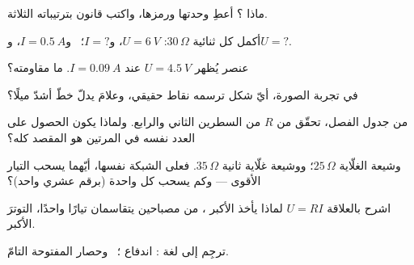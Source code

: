 \begin{exercise}[$\star$]\label{exo:g8:ohms-law:1}
ماذا  ؟ أعطِ وحدتها ورمزها، واكتب قانون 
بترتيباته الثلاثة.
\end{exercise}

\begin{exercise}[$\star$]\label{exo:g8:ohms-law:2}
أكمل كل ثنائية  $30\,\Omega$: $U = \qty{6}{V}$،
و$I = {?}$؛ \ و$I = \qty{0.5}{A}$، و$U = {?}$.
\end{exercise}

\begin{exercise}[$\star$]\label{exo:g8:ohms-law:3}
عنصر يُظهر $U = \qty{4.5}{V}$ عند $I = \qty{0.09}{A}$. ما
مقاومته؟
\end{exercise}

\begin{exercise}[$\star$]\label{exo:g8:ohms-law:4}
في تجربة الصورة، أيّ شكل ترسمه نقاط  حقيقي، وعلامَ يدلّ
خطّ أشدّ ميلًا؟
\end{exercise}

\begin{exercise}[$\star$]\label{exo:g8:ohms-law:5}
من جدول الفصل، تحقّق من $R$ من السطرين الثاني والرابع. ولماذا
يكون الحصول على العدد نفسه في المرتين هو المقصد كله؟
\end{exercise}

\begin{exercise}[$\star$]\label{exo:g8:ohms-law:6}
وشيعة الغلّاية $25\,\Omega$؛ ووشيعة غلّاية ثانية
$35\,\Omega$. فعلى الشبكة نفسها، أيّهما يسحب التيار الأقوى ---
وكم يسحب كل واحدة (برقم عشري واحد)؟
\end{exercise}

\begin{exercise}[$\star$]\label{exo:g8:ohms-law:7}
اشرح بالعلاقة $U = R I$ لماذا يأخذ  الأكبر ، من مصباحين
 يتقاسمان تيارًا واحدًا، التوترَ الأكبر.
\end{exercise}

\begin{exercise}[$\star$]\label{exo:g8:ohms-law:8}
ترجِم إلى لغة : اندفاع ؛ \ وحصار
 المفتوحة التامّ.
\end{exercise}

